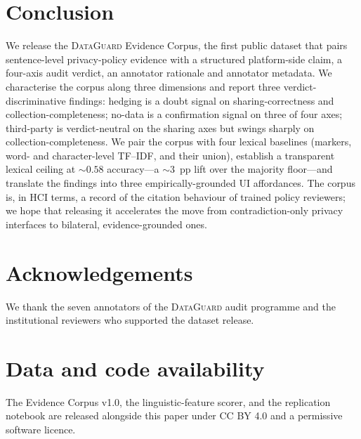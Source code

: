 \documentclass[11pt,a4paper]{article}
\newcommand{\dataguard}{\textsc{DataGuard}}
\begin{document}
\section{Conclusion}\label{sec:conclusion}
We release the \dataguard{} Evidence Corpus, the first public
dataset that pairs sentence-level privacy-policy evidence with a
structured platform-side claim, a four-axis audit verdict, an
annotator rationale and annotator metadata. We characterise the
corpus along three dimensions and report three verdict-discriminative
findings: hedging is a doubt signal on sharing-correctness and
collection-completeness; no-data is a confirmation signal on three
of four axes; third-party is verdict-neutral on the sharing axes but
swings sharply on collection-completeness. We pair the corpus with
four lexical baselines (markers, word- and character-level TF--IDF,
and their union), establish a transparent lexical ceiling at
$\sim 0.58$ accuracy---a $\sim 3$~pp lift over the majority
floor---and translate the findings into three
empirically-grounded UI affordances. The corpus is, in HCI terms, a
record of the citation behaviour of trained policy reviewers; we hope
that releasing it accelerates the move from
contradiction-only privacy interfaces to bilateral, evidence-grounded
ones.

\section*{Acknowledgements}
We thank the seven annotators of the \dataguard{} audit programme and
the institutional reviewers who supported the dataset release.

\section*{Data and code availability}
The Evidence Corpus v1.0, the linguistic-feature scorer, and the
replication notebook are released alongside this paper under CC BY 4.0
and a permissive software licence.


\end{document}
